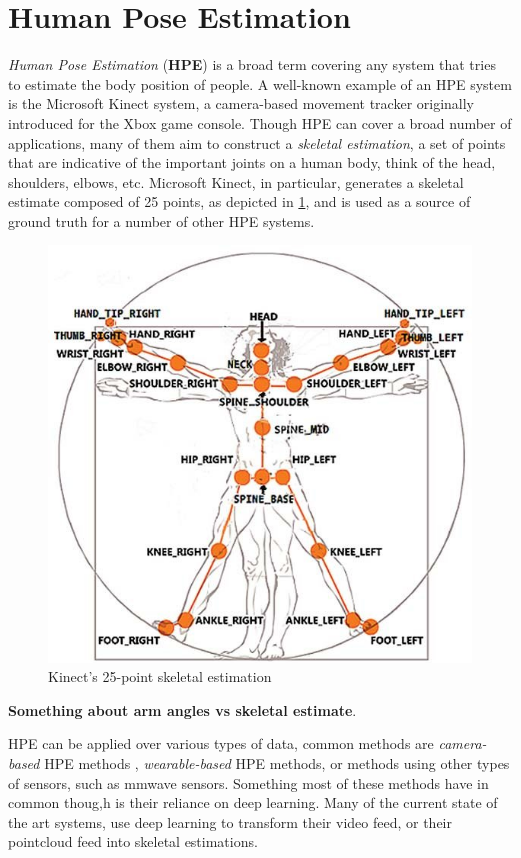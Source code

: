\section{Human Pose Estimation}
\label{section: background - human pose estimation}

\textit{Human Pose Estimation} (\textbf{HPE}) is a broad term covering any system that tries to estimate the body position of people.
A well-known example of an HPE system is the Microsoft Kinect system, a camera-based movement tracker originally introduced for the Xbox game console.
Though HPE can cover a broad number of applications, many of them aim to construct a \textit{skeletal estimation}, a set of points that are indicative of the important joints on a human body, think of the head, shoulders, elbows, etc.
Microsoft Kinect, in particular, generates a skeletal estimate composed of 25 points, as depicted in \cref{fig:kinect_skeletal_estimate}, and is used as a source of ground truth for a number of other HPE systems.


\begin{figure}[h]
    \centering
    \includegraphics[width=0.5\linewidth]{figures/misc/The-skeleton-of-the-Kinect-v2-19.png}
    \caption{Kinect's 25-point skeletal estimation \cite{guffanti2020accuracy}}
    \label{fig:kinect_skeletal_estimate}
\end{figure}

\textbf{Something about arm angles vs skeletal estimate}.


HPE can be applied over various types of data, common methods are \textit{camera-based} HPE methods \cite{Lan2023visionbased}, \textit{wearable-based} HPE methods, or methods using other types of sensors, such as mmwave sensors.
Something most of these methods have in common thoug,h is their reliance on deep learning.
Many of the current state of the art systems, use deep learning to transform their video feed, or their pointcloud feed into skeletal estimations.